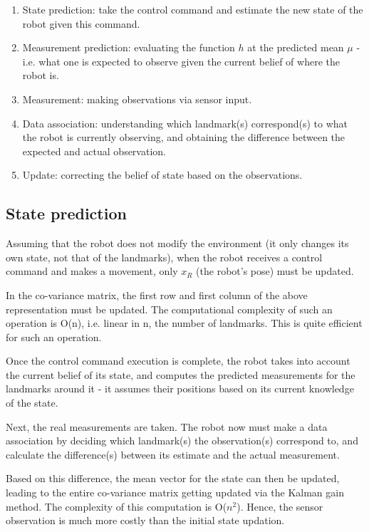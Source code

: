 \documentclass[a4paper]{article}
\begin{document}
\begin{enumerate}
    \item State prediction: take the control command and estimate the new state of the robot given this command.
    \item Measurement prediction: evaluating the function $h$ at the predicted mean $\mu$ - i.e. what one is expected to observe given the current belief of where the robot is.
    \item Measurement: making observations via sensor input.
    \item Data association: understanding which landmark(s) correspond(s) to what the robot is currently observing, and obtaining the difference between the expected and actual observation.
    \item Update: correcting the belief of state based on the observations.
\end{enumerate}

\subsection{State prediction}

Assuming that the robot does not modify the environment (it only changes its own state, not that of the landmarks), when the robot receives a control command and makes a movement, only $x_R$ (the robot's pose) must be updated.

In the co-variance matrix, the first row and first column of the above representation must be updated. The computational complexity of such an operation is O(n), i.e. linear in n, the number of landmarks. This is quite efficient for such an operation.

Once the control command execution is complete, the robot takes into account the current belief of its state, and computes the predicted measurements for the landmarks around it - it assumes their positions based on its current knowledge of the state.

Next, the real measurements are taken. The robot now must make a data association by deciding which landmark(s) the observation(s) correspond to, and calculate the difference(s) between its estimate and the actual measurement.

Based on this difference, the mean vector for the state can then be updated, leading to the entire co-variance matrix getting updated via the Kalman gain method. The complexity of this computation is O($n^2$). Hence, the sensor observation is much more costly than the initial state updation.
\end{document}
